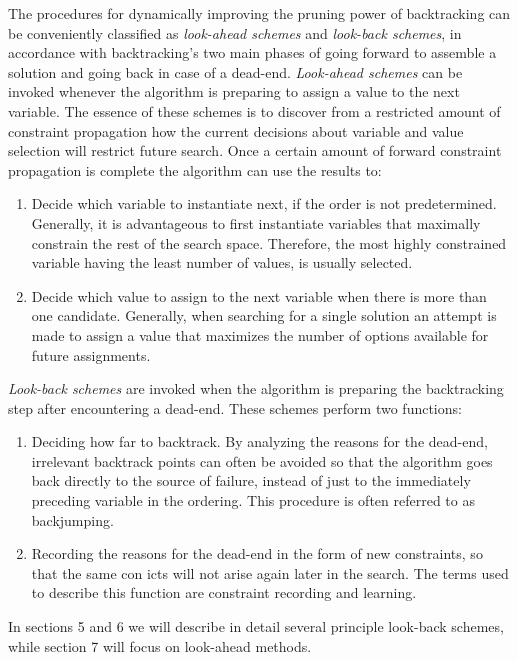 \documentclass{article}
\begin{document}
The procedures for dynamically improving the pruning power of backtracking can be conveniently classified as \textit{look-ahead schemes} and \textit{look-back schemes},
in accordance with backtracking's two main phases of going forward to assemble a solution and going back in case of a dead-end. \textit{Look-ahead schemes} can
be invoked whenever the algorithm is preparing to assign a value to the next
variable. The essence of these schemes is to discover from a restricted amount
of constraint propagation how the current decisions about variable and value
selection will restrict future search. Once a certain amount of forward constraint
propagation is complete the algorithm can use the results to:
\begin{enumerate}
  \item Decide which variable to instantiate next, if the order is not predetermined. Generally, it is advantageous to first instantiate variables that maximally constrain the rest of the search space. Therefore, the most
  highly constrained variable having the least number of values, is usually selected.
  \bigskip
  \item Decide which value to assign to the next variable when there is more than
  one candidate. Generally, when searching for a single solution an attempt
  is made to assign a value that maximizes the number of options available
  for future assignments.
\end{enumerate}
\textit{Look-back schemes} are invoked when the algorithm is preparing the backtracking step after encountering a dead-end. These schemes perform two functions:
\begin{enumerate}
  \item Deciding how far to backtrack. By analyzing the reasons for the dead-end,
  irrelevant backtrack points can often be avoided so that the algorithm goes
  back directly to the source of failure, instead of just to the immediately
  preceding variable in the ordering. This procedure is often referred to as
  backjumping.
  \bigskip
  \item Recording the reasons for the dead-end in the form of new constraints, so
  that the same con icts will not arise again later in the search. The terms
  used to describe this function are constraint recording and learning.
\end{enumerate}
In sections 5 and 6 we will describe in detail several principle look-back
schemes, while section 7 will focus on look-ahead methods.
\end{document}
